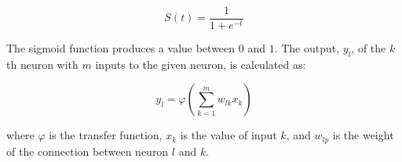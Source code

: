 \[
    S(t) = \frac{1}{1+e^{-t}}
\]

The sigmoid function produces a value between $0$ and $1$.
The output, $y_l$, of the $k$th neuron with $m$ inputs to the given neuron, is calculated as:

\[
    y_l = \varphi\left( \sum_{k=1}^m w_{lk} x_k \right)
\]

where $\varphi$ is the transfer function, $x_k$ is the value of input $k$, and $w_{l p}$ is the weight of the connection between neuron $l$ and $k$.





